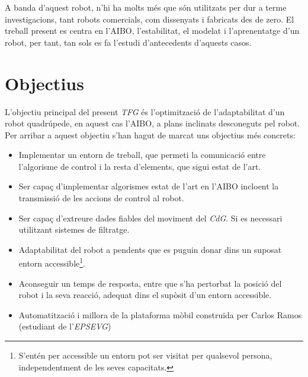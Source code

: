 \documentclass[12pt,a4paper,final,twoside]{report}
\begin{document}
A banda d'aquest robot, n'hi ha molts més que són utilitzats per dur a terme investigacions, tant robots comercials, com dissenyats i fabricats des de zero. El treball present es centra en l'AIBO, l'estabilitat, el modelat i l'aprenentatge d'un robot, per tant, tan sols es fa l'estudi d'antecedents d'aquests casos.


\section{Objectius}
\label{Objectius}


L'objectiu principal del present \textit{TFG} és l'optimització de l'adaptabilitat d'un robot quadrúpede, en aquest cas l'AIBO, a plans inclinats desconeguts pel robot. Per arribar a aquest objectiu s'han hagut de marcat uns objectius més concrets:
\begin{itemize}

\item Implementar un entorn de treball, que permeti la comunicació entre l'algorisme de control i la resta d'elements, que sigui estat de l'art.

\item Ser capaç d'implementar algorismes estat de l'art en l'AIBO incloent la transmissió de les accions de control al robot.

\item Ser capaç d'extreure dades fiables del moviment del \textit{CdG}. Si es necessari utilitzant sistemes de filtratge.

\item Adaptabilitat del robot a pendents que es puguin donar dins un suposat entorn accessible\footnote{S'entén per accessible un entorn pot ser visitat per qualsevol persona, independentment de les seves capacitats.}.

\item Aconseguir un temps de resposta, entre que s'ha pertorbat la posició del robot i la seva reacció, adequat dins el supòsit d'un entorn accessible.

\item Automatització i millora de la plataforma mòbil construïda per Carlos Ramos (estudiant de l'\textit{EPSEVG}) \cite{TFG_Carlos_Ramos}

\end{itemize}
\end{document}
